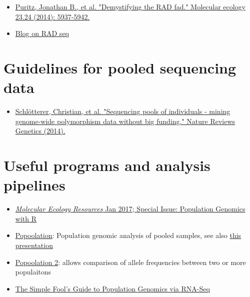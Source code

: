 \documentclass[11pt]{article}
\begin{document}
\begin{itemize}
\item \href{http://onlinelibrary.wiley.com/doi/10.1111/mec.12965/full}{Puritz, Jonathan B., et al. "Demystifying the RAD fad." Molecular ecology 23.24 (2014): 5937-5942.}
\end{itemize}


\begin{itemize}
\item \href{http://ngs-expert.com/tag/rad-seq/}{Blog on RAD seq}
\end{itemize}

\section{Guidelines for pooled sequencing data}
\label{sec-2}
\begin{itemize}
\item \href{http://www.nature.com/nrg/journal/v15/n11/full/nrg3803.html}{Schlötterer, Christian, et al. "Sequencing pools of individuals - mining genome-wide polymorphism data without big funding." Nature Reviews Genetics (2014).}
\end{itemize}

\section{Useful programs and analysis pipelines}
\label{sec-3}

\begin{itemize}
\item \href{http://onlinelibrary.wiley.com/doi/10.1111/men.2017.17.issue-1/issuetoc}{\emph{Molecular Ecology Resources} Jan 2017; Special Issue: Population Genomics with R}

\item \href{http://code.google.com/p/popoolation/}{Popoolation}: Population genomic analysis of pooled samples, see also \href{http://drrobertkofler.wikispaces.com/file/view/pooledAnalysis_part1.pdf/489488280/pooledAnalysis_part1.pdf}{this presentation}
\end{itemize}


\begin{itemize}
\item \href{http://code.google.com/p/popoolation2/}{Popoolation 2}: allows comparison of allele frequencies between two or more populaitons
\end{itemize}


\begin{itemize}
\item \href{http://sfg.stanford.edu/guide.html}{The Simple Fool's Guide to Population Genomics via RNA-Seq}
\end{itemize}
\end{document}

